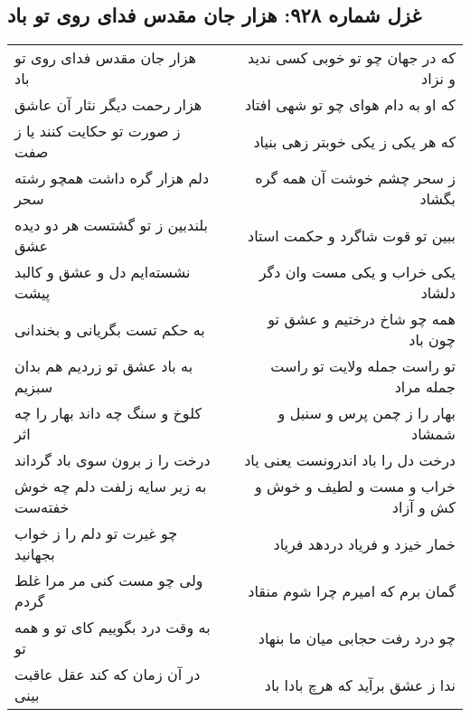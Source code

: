 \begin{center}
\section*{غزل شماره ۹۲۸: هزار جان مقدس فدای روی تو باد}
\label{sec:0928}
\begin{longtable}{l p{0.5cm} r}
هزار جان مقدس فدای روی تو باد
&&
که در جهان چو تو خوبی کسی ندید و نزاد
\\
هزار رحمت دیگر نثار آن عاشق
&&
که او به دام هوای چو تو شهی افتاد
\\
ز صورت تو حکایت کنند یا ز صفت
&&
که هر یکی ز یکی خوبتر زهی بنیاد
\\
دلم هزار گره داشت همچو رشته سحر
&&
ز سحر چشم خوشت آن همه گره بگشاد
\\
بلندبین ز تو گشتست هر دو دیده عشق
&&
ببین تو قوت شاگرد و حکمت استاد
\\
نشسته‌ایم دل و عشق و کالبد پیشت
&&
یکی خراب و یکی مست وان دگر دلشاد
\\
به حکم تست بگریانی و بخندانی
&&
همه چو شاخ درختیم و عشق تو چون باد
\\
به باد عشق تو زردیم هم بدان سبزیم
&&
تو راست جمله ولایت تو راست جمله مراد
\\
کلوخ و سنگ چه داند بهار را چه اثر
&&
بهار را ز چمن پرس و سنبل و شمشاد
\\
درخت را ز برون سوی باد گرداند
&&
درخت دل را باد اندرونست یعنی یاد
\\
به زیر سایه زلفت دلم چه خوش خفته‌ست
&&
خراب و مست و لطیف و خوش و کش و آزاد
\\
چو غیرت تو دلم را ز خواب بجهانید
&&
خمار خیزد و فریاد دردهد فریاد
\\
ولی چو مست کنی مر مرا غلط گردم
&&
گمان برم که امیرم چرا شوم منقاد
\\
به وقت درد بگوییم کای تو و همه تو
&&
چو درد رفت حجابی میان ما بنهاد
\\
در آن زمان که کند عقل عاقبت بینی
&&
ندا ز عشق برآید که هرچ بادا باد
\\
\end{longtable}
\end{center}
